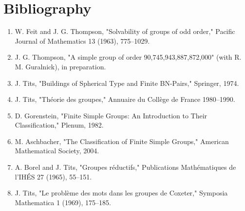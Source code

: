 \section*{Bibliography}

\begin{enumerate}
\item W. Feit and J. G. Thompson, "Solvability of groups of odd order," Pacific Journal of Mathematics 13 (1963), 775--1029.
\item J. G. Thompson, "A simple group of order 90,745,943,887,872,000" (with R. M. Guralnick), in preparation.
\item J. Tits, "Buildings of Spherical Type and Finite BN-Pairs," Springer, 1974.
\item J. Tits, "Th\'eorie des groupes," Annuaire du Coll\`ege de France 1980--1990.
\item D. Gorenstein, "Finite Simple Groups: An Introduction to Their Classification," Plenum, 1982.
\item M. Aschbacher, "The Classification of Finite Simple Groups," American Mathematical Society, 2004.
\item A. Borel and J. Tits, "Groupes r\'eductifs," Publications Math\'ematiques de l'IH\'ES 27 (1965), 55--151.
\item J. Tits, "Le probl\`eme des mots dans les groupes de Coxeter," Symposia Mathematica 1 (1969), 175--185.
\end{enumerate}
